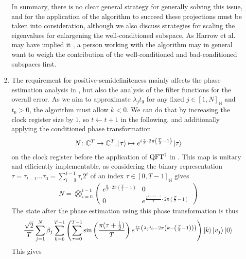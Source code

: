 \begin{enumerate}[label=\arabic*.]
    \phantom{}

    In summary, there is no clear general strategy for generally solving this issue, and for the application of the algorithm to succeed these projections must be taken into consideration, although we also discuss strategies for scaling the eigenvalues for enlargening the well-conditioned subspace. As Harrow et al. may have implied it \cite[p. 7]{Harrow2008}, a person working with the algorithm may in general want to weigh the contribution of the well-conditioned and bad-conditioned subspaces first.
    \item The requirement for positive-semidefiniteness mainly affects the phase estimation analysis in , but also the analysis of the filter functions for the overall error. As we aim to approximate \(\lambda_j t_0\) for any fixed \(j \in [1, N]_{\mathbb{N}}\) and \(t_0 > 0\), the algorithm must allow \(k < 0\). We can do that by increasing the clock register size by \(1\), so \(t \gets t + 1\) in the following, and additionally applying the conditioned phase transformation
    \begin{align}
        N\colon \mathbb{C}^{T} \to \mathbb{C}^{T}, \ket{\tau} \mapsto e^{i\frac{\tau}{T} \cdot 2\pi\left(\frac{T}{2}-1\right)}\ket{\tau}
    \end{align}
    on the clock register before the application of \(\operatorname{QFT}^\dagger\) in . This map is unitary and efficiently implementable, as considering the binary representation \(\tau = \tau_{t-1}...\tau_0 = \sum_{i=0}^{t-1} \tau_i 2^i\) of an index \(\tau \in [0, T-1]_{\mathbb{N}}\) gives
    \begin{align}
        N = \bigotimes_{i=0}^{t-1} \begin{pmatrix}
            e^{\frac{0}{T}\cdot 2\pi \left(\frac{T}{2}-1\right)} & 0\\
            0 & e^{\frac{2^{(t-1)-i}}{T}\cdot 2\pi \left(\frac{T}{2}-1\right)}
        \end{pmatrix}
    \end{align}
    The state after the phase estimation using this phase transformation is thus
    \begin{align}
        \frac{\sqrt{2}}{T} \sum_{j = 1}^N \beta_j \sum_{k = 0}^{T-1} \left(\sum_{\tau = 0}^{T-1} \sin\left(\frac{\pi(\tau+\frac{1}{2})}{T}\right) e^{\frac{i \tau}{T} \left(\lambda_j t_0 - 2 \pi \left(k-\left(\frac{T}{2}-1\right)\right)\right)}\right) \ket{k} \ket{v_j} \ket{0}
    \end{align}
    This gives

\end{enumerate}
